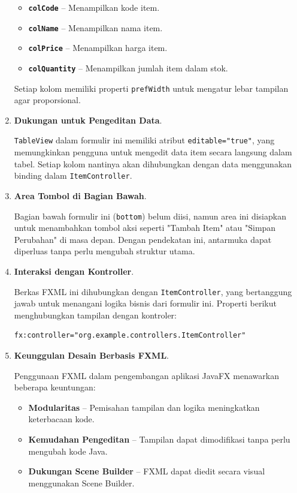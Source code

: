 \begin{enumerate}
	\begin{itemize}
		\item \textbf{\texttt{colCode}} – Menampilkan kode item.
		\item \textbf{\texttt{colName}} – Menampilkan nama item.
		\item \textbf{\texttt{colPrice}} – Menampilkan harga item.
		\item \textbf{\texttt{colQuantity}} – Menampilkan jumlah item dalam stok.
	\end{itemize}
	
	Setiap kolom memiliki properti \texttt{prefWidth} untuk mengatur lebar tampilan agar proporsional.
	
	\item \textbf{Dukungan untuk Pengeditan Data}.
	
	\texttt{TableView} dalam formulir ini memiliki atribut \texttt{editable="true"}, yang memungkinkan pengguna untuk mengedit data item secara langsung dalam tabel. Setiap kolom nantinya akan dihubungkan dengan data menggunakan binding dalam \texttt{ItemController}.
	
	\item \textbf{Area Tombol di Bagian Bawah}.
	
	Bagian bawah formulir ini (\texttt{bottom}) belum diisi, namun area ini disiapkan untuk menambahkan tombol aksi seperti "Tambah Item" atau "Simpan Perubahan" di masa depan. Dengan pendekatan ini, antarmuka dapat diperluas tanpa perlu mengubah struktur utama.
	
	\item \textbf{Interaksi dengan Kontroller}.
	
	Berkas FXML ini dihubungkan dengan \texttt{ItemController}, yang bertanggung jawab untuk menangani logika bisnis dari formulir ini. Properti berikut menghubungkan tampilan dengan kontroler:
	
	\begin{lstlisting}[style=XmlStyle]
		fx:controller="org.example.controllers.ItemController"
	\end{lstlisting}
	
	\item \textbf{Keunggulan Desain Berbasis FXML}.
	
	Penggunaan FXML dalam pengembangan aplikasi JavaFX menawarkan beberapa keuntungan:
	
	\begin{itemize}
		\item \textbf{Modularitas} – Pemisahan tampilan dan logika meningkatkan keterbacaan kode.
		\item \textbf{Kemudahan Pengeditan} – Tampilan dapat dimodifikasi tanpa perlu mengubah kode Java.
		\item \textbf{Dukungan Scene Builder} – FXML dapat diedit secara visual menggunakan Scene Builder.
	\end{itemize}
	

\end{enumerate}
